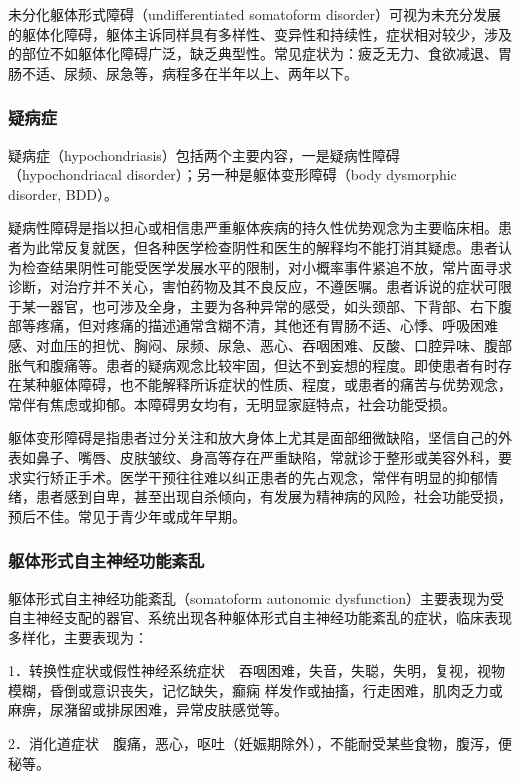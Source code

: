 未分化躯体形式障碍（undifferentiated somatoform
disorder）可视为未充分发展的躯体化障碍，躯体主诉同样具有多样性、变异性和持续性，症状相对较少，涉及的部位不如躯体化障碍广泛，缺乏典型性。常见症状为：疲乏无力、食欲减退、胃肠不适、尿频、尿急等，病程多在半年以上、两年以下。

\subsubsection{疑病症}

疑病症（hypochondriasis）包括两个主要内容，一是疑病性障碍（hypochondriacal
disorder）；另一种是躯体变形障碍（body dysmorphic disorder, BDD）。

疑病性障碍是指以担心或相信患严重躯体疾病的持久性优势观念为主要临床相。患者为此常反复就医，但各种医学检查阴性和医生的解释均不能打消其疑虑。患者认为检查结果阴性可能受医学发展水平的限制，对小概率事件紧追不放，常片面寻求诊断，对治疗并不关心，害怕药物及其不良反应，不遵医嘱。患者诉说的症状可限于某一器官，也可涉及全身，主要为各种异常的感受，如头颈部、下背部、右下腹部等疼痛，但对疼痛的描述通常含糊不清，其他还有胃肠不适、心悸、呼吸困难感、对血压的担忧、胸闷、尿频、尿急、恶心、吞咽困难、反酸、口腔异味、腹部胀气和腹痛等。患者的疑病观念比较牢固，但达不到妄想的程度。即使患者有时存在某种躯体障碍，也不能解释所诉症状的性质、程度，或患者的痛苦与优势观念，常伴有焦虑或抑郁。本障碍男女均有，无明显家庭特点，社会功能受损。

躯体变形障碍是指患者过分关注和放大身体上尤其是面部细微缺陷，坚信自己的外表如鼻子、嘴唇、皮肤皱纹、身高等存在严重缺陷，常就诊于整形或美容外科，要求实行矫正手术。医学干预往往难以纠正患者的先占观念，常伴有明显的抑郁情绪，患者感到自卑，甚至出现自杀倾向，有发展为精神病的风险，社会功能受损，预后不佳。常见于青少年或成年早期。

\subsubsection{躯体形式自主神经功能紊乱}

躯体形式自主神经功能紊乱（somatoform autonomic
dysfunction）主要表现为受自主神经支配的器官、系统出现各种躯体形式自主神经功能紊乱的症状，临床表现多样化，主要表现为：

1．转换性症状或假性神经系统症状　吞咽困难，失音，失聪，失明，复视，视物模糊，昏倒或意识丧失，记忆缺失，癫痫
样发作或抽搐，行走困难，肌肉乏力或麻痹，尿潴留或排尿困难，异常皮肤感觉等。

2．消化道症状　腹痛，恶心，呕吐（妊娠期除外），不能耐受某些食物，腹泻，便秘等。

